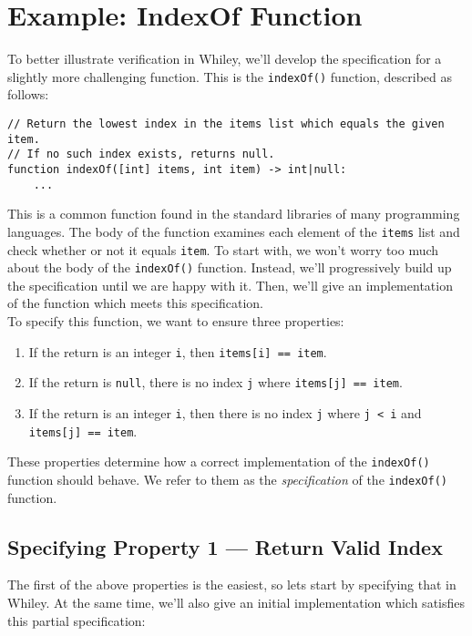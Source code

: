 \newpage
\section{Example: IndexOf Function}

To better illustrate verification in Whiley, we'll develop the
specification for a slightly more challenging function.  This is the
\lstinline{indexOf()} function, described as follows:

\begin{lstlisting}
// Return the lowest index in the items list which equals the given item.
// If no such index exists, returns null.
function indexOf([int] items, int item) -> int|null:
    ...
\end{lstlisting}

This is a common function found in the standard libraries of many
programming languages.  The body of the function examines each element
of the \lstinline{items} list and check whether or not it equals
\lstinline{item}.  To start with, we won't worry too much about the
body of the \lstinline{indexOf()} function.  Instead, we'll
progressively build up the specification until we are happy with it.
Then, we'll give an implementation of the function which meets this
specification.\\

\noindent To specify this function, we want to ensure three properties:

\begin{enumerate}
\item If the return is an integer \lstinline{i}, then
  \lstinline{items[i] == item}.
\item If the return is \lstinline{null}, there is no index
  \lstinline{j} where \lstinline{items[j] == item}.
\item If the return is an integer \lstinline{i}, then there is
  no index \lstinline{j} where \lstinline{j < i} and
  \lstinline{items[j] == item}.
\end{enumerate}

These properties determine how a correct implementation of the
\lstinline{indexOf()} function should behave.  We refer to them as the
{\em specification} of the \lstinline{indexOf()} function.

\subsection{Specifying Property 1 --- Return Valid Index}

The first of the above properties is the easiest, so lets start by
specifying that in Whiley.  At the same time, we'll also give an
initial implementation which satisfies this partial specification:


